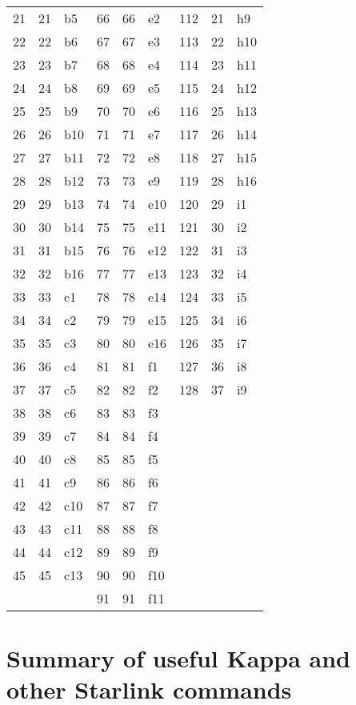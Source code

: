 \documentclass[twoside,11pt]{article}
\newcommand{\xlabel}[1]{}
\begin{document}
{{\begin{flushleft}
\begin{tabular}{rrlrrlrrl}
21  & 21 & b5 & 66 & 66 & e2 & 112 & 21 & h9 \\
22  & 22 & b6 & 67 & 67 & e3 & 113 & 22 & h10 \\
23  & 23 & b7 & 68 & 68 & e4 & 114 & 23 & h11 \\
24  & 24 & b8 & 69 & 69 & e5 & 115 & 24 & h12 \\
25  & 25 & b9 & 70 & 70 & e6 & 116 & 25 & h13 \\
26  & 26 & b10 & 71 & 71 & e7 & 117 & 26 & h14 \\
27  & 27 & b11 & 72 & 72 & e8 & 118 & 27 & h15 \\
28  & 28 & b12 & 73 & 73 & e9 & 119 & 28 & h16 \\
29  & 29 & b13 & 74 & 74 & e10 & 120 & 29 & i1 \\
30  & 30 & b14 & 75 & 75 & e11 & 121 & 30 & i2 \\
31  & 31 & b15 & 76 & 76 & e12 & 122 & 31 & i3 \\
32  & 32 & b16 & 77 & 77 & e13 & 123 & 32 & i4 \\
33  & 33 & c1  & 78 & 78 & e14 & 124 & 33 & i5 \\
34  & 34 & c2  & 79 & 79 & e15 & 125 & 34 & i6 \\
35  & 35 & c3  & 80 & 80 & e16 & 126 & 35 & i7 \\
36  & 36 & c4  & 81 & 81 & f1 & 127 & 36 & i8 \\
37  & 37 & c5  & 82 & 82 & f2 & 128 & 37 & i9 \\
38  & 38 & c6  & 83 & 83 & f3 &  &  & \\
39  & 39 & c7  & 84 & 84 & f4 &  &  & \\
40  & 40 & c8  & 85 & 85 & f5 &  &  & \\
41  & 41 & c9  & 86 & 86 & f6 &  &  & \\
42  & 42 & c10 & 87 & 87 & f7 &  &  & \\
43  & 43 & c11 & 88 & 88 & f8 &  &  & \\
44  & 44 & c12 & 89 & 89 & f9 &  &  & \\
45  & 45 & c13 & 90 & 90 & f10 & & & \\
    &    &     & 91 & 91 & f11 & & & \\
\end{tabular}
\end{flushleft}
}
\newpage
\section{\xlabel{summary_of_useful_kappa_and_other_starlink_commands}Summary of useful Kappa and other Starlink commands}

}
\end{document}
